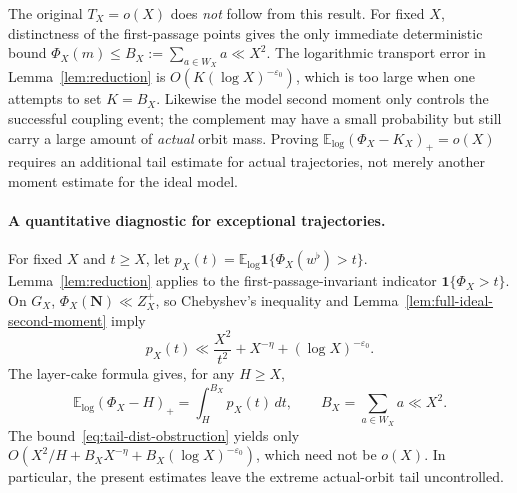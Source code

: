 \begin{remark}
The original $T_X=o(X)$ does \emph{not} follow from this result.
For fixed $X$, distinctness of the first-passage points gives the
only immediate deterministic bound
$\Phi_X(m)\le B_X:=\sum_{a\in W_X}a\ll X^2$.
The logarithmic transport error in Lemma~\ref{lem:reduction}
is $O(K(\log X)^{-\varepsilon_0})$, which is too large
when one attempts to set $K=B_X$. Likewise the model second moment
only controls the successful coupling event; the complement may
have a small probability but still carry a large amount of
\emph{actual} orbit mass.
Proving $\mathbb E_{\log}(\Phi_X-K_X)_+=o(X)$ requires an
additional tail estimate for actual trajectories, not merely
another moment estimate for the ideal model.
\end{remark}


\paragraph{A quantitative diagnostic for exceptional trajectories.}
For fixed $X$ and $t\ge X$, let
$p_X(t)=\mathbb E_{\log}\mathbf 1\{\Phi_X(w^\flat)>t\}$.
Lemma~\ref{lem:reduction} applies to the first-passage-invariant
indicator $\mathbf 1\{\Phi_X>t\}$. On $G_X$,
$\Phi_X(\mathbf N)\ll Z_X^+$, so Chebyshev's inequality and
Lemma~\ref{lem:full-ideal-second-moment} imply
\begin{equation}\label{eq:tail-dist-obstruction}
 p_X(t)\ll\frac{X^2}{t^2}
     +X^{-\eta}+(\log X)^{-\varepsilon_0}.
\end{equation}
The layer-cake formula gives, for any $H\ge X$,
\[
 \mathbb E_{\log}(\Phi_X-H)_+
 =\int_H^{B_X}p_X(t)\,dt,
 \qquad B_X=\sum_{a\in W_X}a\ll X^2.
\]
The bound~\eqref{eq:tail-dist-obstruction} yields only
$O(X^2/H+B_XX^{-\eta}+B_X(\log X)^{-\varepsilon_0})$,
which need not be $o(X)$. In particular, the present estimates
leave the extreme actual-orbit tail uncontrolled.
